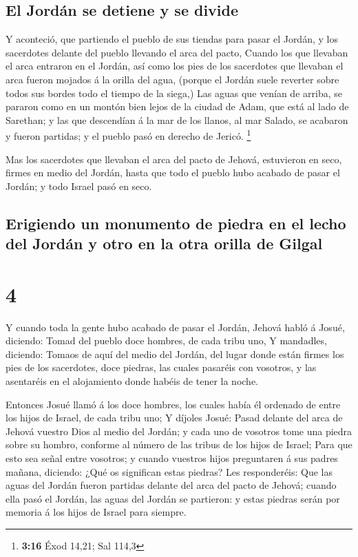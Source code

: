 \hypertarget{el-jorduxe1n-se-detiene-y-se-divide}{%
\subsection{El Jordán se detiene y se
divide}\label{el-jorduxe1n-se-detiene-y-se-divide}}

 Y aconteció, que partiendo el pueblo de sus tiendas para
pasar el Jordán, y los sacerdotes delante del pueblo llevando el arca
del pacto,  Cuando los que llevaban el arca entraron en el
Jordán, así como los pies de los sacerdotes que llevaban el arca fueron
mojados á la orilla del agua, (porque el Jordán suele reverter sobre
todos sus bordes todo el tiempo de la siega,)  Las aguas
que venían de arriba, se pararon como en un montón bien lejos de la
ciudad de Adam, que está al lado de Sarethan; y las que descendían á la
mar de los llanos, al mar Salado, se acabaron y fueron partidas; y el
pueblo pasó en derecho de Jericó. \footnote{\textbf{3:16} Éxod 14,21;
  Sal 114,3}

 Mas los sacerdotes que llevaban el arca del pacto de
Jehová, estuvieron en seco, firmes en medio del Jordán, hasta que todo
el pueblo hubo acabado de pasar el Jordán; y todo Israel pasó en seco.

\hypertarget{erigiendo-un-monumento-de-piedra-en-el-lecho-del-jorduxe1n-y-otro-en-la-otra-orilla-de-gilgal}{%
\subsection{Erigiendo un monumento de piedra en el lecho del Jordán y
otro en la otra orilla de
Gilgal}\label{erigiendo-un-monumento-de-piedra-en-el-lecho-del-jorduxe1n-y-otro-en-la-otra-orilla-de-gilgal}}

\hypertarget{section-3}{%
\section{4}\label{section-3}}

 Y cuando toda la gente hubo acabado de pasar el Jordán,
Jehová habló á Josué, diciendo:  Tomad del pueblo doce
hombres, de cada tribu uno,  Y mandadles, diciendo: Tomaos
de aquí del medio del Jordán, del lugar donde están firmes los pies de
los sacerdotes, doce piedras, las cuales pasaréis con vosotros, y las
asentaréis en el alojamiento donde habéis de tener la noche.

 Entonces Josué llamó á los doce hombres, los cuales había
él ordenado de entre los hijos de Israel, de cada tribu uno;
 Y díjoles Josué: Pasad delante del arca de Jehová vuestro
Dios al medio del Jordán; y cada uno de vosotros tome una piedra sobre
su hombro, conforme al número de las tribus de los hijos de Israel;
 Para que esto sea señal entre vosotros; y cuando vuestros
hijos preguntaren á sus padres mañana, diciendo: ¿Qué os significan
estas piedras?  Les responderéis: Que las aguas del Jordán
fueron partidas delante del arca del pacto de Jehová; cuando ella pasó
el Jordán, las aguas del Jordán se partieron: y estas piedras serán por
memoria á los hijos de Israel para siempre.

